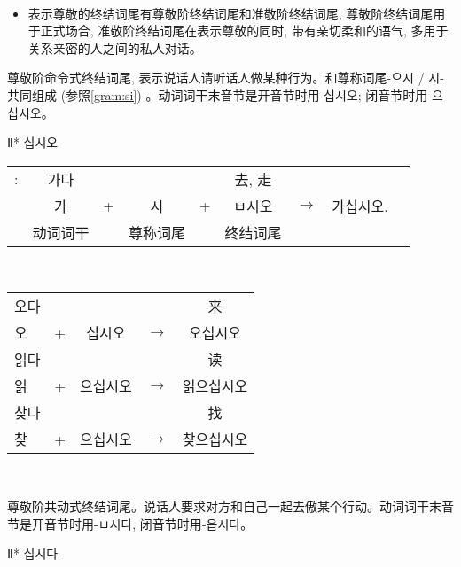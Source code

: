 \begin{grammar}
\begin{grammarsect}[尊敬阶终结词尾]
\begin{tabular}{|c|c|c|c|c|}
        \end{tabular}\\
        \begin{itemize}
            \item 表示尊敬的终结词尾有尊敬阶终结词尾和准敬阶终结词尾, 尊敬阶终结词尾用于正式场合, 准敬阶终结词尾在表示尊敬的同时, 带有亲切柔和的语气, 多用于关系亲密的人之间的私人对话。
        \end{itemize}
    \end{grammarsect}
    \begin{grammarsect}[\kr -ㅂ시오]\label{gram:bsio}
        \begin{itemize}
            \item 尊敬阶命令式终结词尾, 表示说话人请听话人做某种行为。和尊称词尾{\kr -으시 / 시-}共同组成 (参照\ref{gram:si}) 。动词词干末音节是开音节时用-십시오;
闭音节时用{\kr -으십시오}。 
            {\color{gray} \item Ⅱ*{\kr -십시오}} 
        \end{itemize}
        \begin{tabular}{ccccccccc}
            \kr \ruby{例}{예}:&\kr 가다&&&&去, 走\\
            &\kr 가&+&\kr 시&+&\kr ㅂ시오&$\to$&\kr 가십시오.\\\cline{2-2}\cline{4-4}\cline{6-6}
            &动词词干&&尊称词尾&&终结词尾
        \end{tabular}\\
        \begin{tabular}{lcccc}
            \kr 오다 &&&&来\\
            \kr 오 &+ &\kr 십시오&$\to$&\kr 오십시오\\
            \kr 읽다 &&&&读\\
            \kr 읽 &+&\kr 으십시오&$\to$&\kr 읽으십시오\\
            \kr 찾다 &&&&找 \\
            \kr 찾 &+ &\kr 으십시오&$\to$&\kr 찾으십시오 
        \end{tabular}\\
    \end{grammarsect}
    \begin{grammarsect}[\kr -(으){}ㅂ시다]
        \begin{itemize}
            \item 尊敬阶共动式终结词尾。说话人要求对方和自己一起去傲某个行动。动词词干末音节是开音节时用{\kr -ㅂ시다}, 闭音节时用{\kr -읍시다}。
            {\color{gray} \item Ⅱ*{\kr -십시다}} 

\end{itemize}
\end{grammarsect}
\end{grammar}
